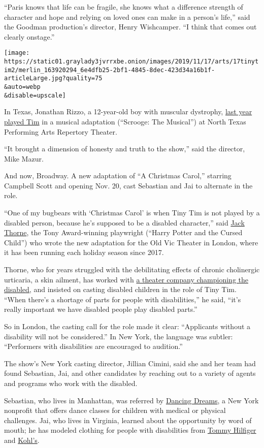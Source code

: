 ``Paris knows that life can be fragile, she knows what a difference
strength of character and hope and relying on loved ones can make in a
person's life,'' said the Goodman production's director, Henry
Wishcamper. ``I think that comes out clearly onstage.''

\texttt{[image: https://static01.graylady3jvrrxbe.onion/images/2019/11/17/arts/17tinytim2/merlin\_163920294\_6e4dfb25-2bf1-4845-8dec-423d34a16b1f-articleLarge.jpg?quality=75\\\&auto=webp\\\&disable=upscale]}

In Texas, Jonathan Rizzo, a 12-year-old boy with muscular dystrophy,
\href{http://planomagazine.com/ntpa-repertory-theatre-casts-a-real-life-tiny-tim/}{last
year played Tim} in a musical adaptation (``Scrooge: The Musical'') at
North Texas Performing Arts Repertory Theater.

``It brought a dimension of honesty and truth to the show,'' said the
director, Mike Mazur.

And now, Broadway. A new adaptation of ``A Christmas Carol,'' starring
Campbell Scott and opening Nov. 20, cast Sebastian and Jai to alternate
in the role.

``One of my bugbears with `Christmas Carol' is when Tiny Tim is not
played by a disabled person, because he's supposed to be a disabled
character,'' said \href{https://nyti.ms/32oH9Do}{Jack Thorne}, the Tony
Award-winning playwright (``Harry Potter and the Cursed Child'') who
wrote the new adaptation for the Old Vic Theater in London, where it has
been running each holiday season since 2017.

Thorne, who for years struggled with the debilitating effects of chronic
cholinergic urticaria, a skin ailment, has worked with
\href{https://graeae.org/}{a theater company championing the disabled,}
and insisted on casting disabled children in the role of Tiny Tim.
``When there's a shortage of parts for people with disabilities,'' he
said, ``it's really important we have disabled people play disabled
parts.''

So in London, the casting call for the role made it clear: ``Applicants
without a disability will not be considered.'' In New York, the language
was subtler: ``Performers with disabilities are encouraged to
audition.''

The show's New York casting director, Jillian Cimini, said she and her
team had found Sebastian, Jai, and other candidates by reaching out to a
variety of agents and programs who work with the disabled.

Sebastian, who lives in Manhattan, was referred by
\href{https://dancingdreams.org/}{Dancing Dreams}, a New York nonprofit
that offers dance classes for children with medical or physical
challenges. Jai, who lives in Virginia, learned about the opportunity by
word of mouth; he has modeled clothing for people with disabilities from
\href{https://mashable.com/2018/04/06/tommy-hilfiger-tommy-adaptive-disibility-friendly-clothing/}{Tommy
Hilfiger} and
\href{https://www.usatoday.com/story/money/2019/06/12/adaptive-apparel-goes-more-mainstream-kohls-adds-options-kids/1415312001/}{Kohl's}.


